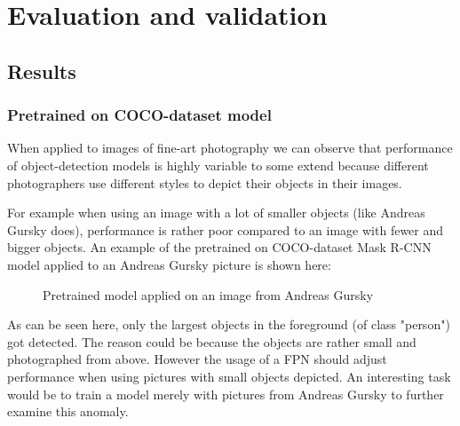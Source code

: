 \chapter{Evaluation and validation}
\label{ch:Eval}

\section{Results}

\subsection{Pretrained on COCO-dataset model}

When applied to images of fine-art photography we can observe that performance of object-detection models is highly variable to some extend because different photographers use different styles to depict their objects in their images.

For example when using an image with a lot of smaller objects (like Andreas Gursky does), performance is rather poor compared to an image with fewer and bigger objects. An example of the pretrained on COCO-dataset Mask R-CNN model applied to an Andreas Gursky picture is shown here:

\begin{figure}[H]
	\caption{\label{fig:fpn} Pretrained model applied on an image from Andreas Gursky}
\end{figure}

As can be seen here, only the largest objects in the foreground (of class "person") got detected. The reason could be because the objects are rather small and photographed from above. However the usage of a FPN should adjust performance when using pictures with small objects depicted. An interesting task would be to train a model merely with pictures from Andreas Gursky to further examine this anomaly.

